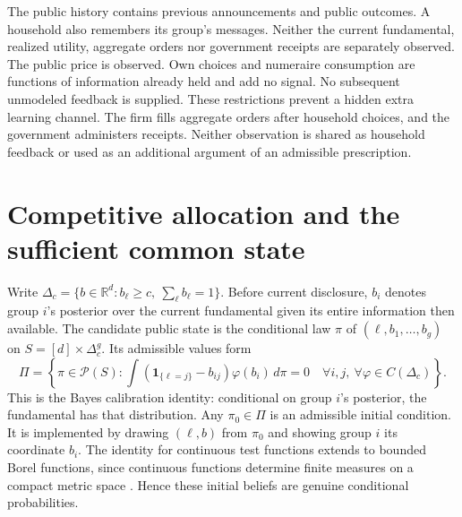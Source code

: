 \documentclass[11pt,a4paper]{article}
\newcommand{\R}{\mathbb R}
\newcommand{\ind}{\mathbf 1}
\newcommand{\cP}{\mathcal P}
\newcommand{\dd}{\,d}
\begin{document}
The public history contains previous announcements and public outcomes. A
household also remembers its group's messages. Neither the current fundamental,
realized utility, aggregate orders nor government receipts are separately
observed. The public price is observed. Own choices and numeraire consumption
are functions of information already held and add no signal. No subsequent
unmodeled feedback is supplied. These restrictions prevent a hidden extra
learning channel.
The firm fills aggregate orders after household choices, and the government
administers receipts. Neither observation is shared as household feedback or
used as an additional argument of an admissible prescription.

\section{Competitive allocation and the sufficient common state}
Write $\Delta_c=\{b\in\R^d:b_\ell\geq c,\ \sum_\ell b_\ell=1\}$.
Before current disclosure, $b_i$ denotes group $i$'s posterior over the current
fundamental given its entire information then available. The candidate public
state is the conditional law $\pi$ of $(\ell,b_1,\ldots,b_g)$ on
$S=[d]\times\Delta_c^g$. Its admissible values form
\begin{equation}\label{eq:calibration}
 \Pi=\left\{\pi\in\cP(S):
 \int(\ind_{\{\ell=j\}}-b_{ij})\varphi(b_i)\dd\pi=0
 \quad\forall i,j,\ \forall\varphi\in C(\Delta_c)\right\}.
\end{equation}
This is the Bayes calibration identity: conditional on group $i$'s posterior,
the fundamental has that distribution. Any $\pi_0\in\Pi$ is an admissible
initial condition. It is implemented by drawing $(\ell,b)$ from $\pi_0$ and
showing group $i$ its coordinate $b_i$. The identity for continuous test
functions extends to bounded Borel functions, since continuous functions
determine finite measures on a compact metric space
\cite[Section 2, pp.\ 4--5]{billingsley}. Hence these initial
beliefs are genuine conditional probabilities.
\end{document}
